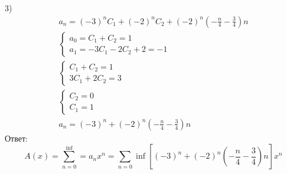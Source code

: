 \begin{task}
\begin{solution}
        3)
        \begin{gather*}
            a_n=(-3)^nC_1 + (-2)^nC_2 + (-2)^n(-\frac{n}{4}-\frac{3}{4})n \\
            \begin{cases}
                a_0 = C_1 + C_2 = 1 \\
                a_1 = -3C_1-2C_2+2=-1
            \end{cases} \\
            \begin{cases}
                C_1 + C_2=1 \\
                3C_1 + 2C_2=3
            \end{cases} \\
            \begin{cases}
                C_2 = 0 \\
                C_1 = 1
            \end{cases} \\
            a_n=(-3)^n+(-2)^n(-\frac{n}{4}-\frac{3}{4})n
        \end{gather*}
        Ответ:
        \begin{equation*}
            A(x) = \sum_{n=0}^{\inf}=a_nx^n=\sum_{n=0}{\inf}\left[(-3)^n+(-2)^n\left(-
            \frac{n}{4}-\frac{3}{4}\right)n\right]x^n
        \end{equation*}
    \end{solution}
\end{task}

